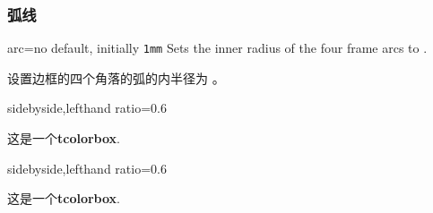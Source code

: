 \subsubsection{弧线}
\begin{docTcbKey}{arc}{=}{no default, initially \texttt{1mm}}
Sets the inner radius of the four frame arcs to .

设置边框的四个角落的弧的内半径为 。


\begin{dispExample*}{sidebyside,lefthand ratio=0.6}
\begin{tcolorbox}[arc=0mm]
这是一个\textbf{tcolorbox}.
\end{tcolorbox}
\end{dispExample*}

\begin{dispExample*}{sidebyside,lefthand ratio=0.6}
\begin{tcolorbox}[arc=3mm]
这是一个\textbf{tcolorbox}.
\end{tcolorbox}
\end{dispExample*}
\end{docTcbKey}



 

 



